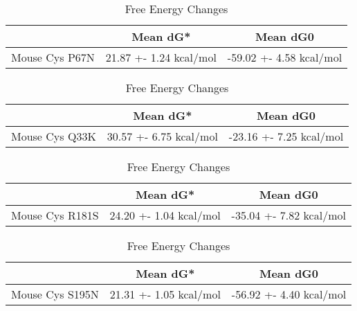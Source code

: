                     \begin{table}[ht]
                      \centering
                      \begin{tabular}{|c|c|c|}
                      \hline
                        & Mean dG* & Mean dG0 \\
                      \hline
               Mouse Cys P67N & 21.87 +- 1.24 kcal/mol & -59.02 +- 4.58 kcal/mol \\
                      \hline
                      \end{tabular}
                      \caption{Free Energy Changes}
                      \end{table}
                      
                    
                      \begin{table}[ht]
                        \centering
                        \begin{tabular}{|c|c|c|}
                        \hline
                          & Mean dG* & Mean dG0 \\
                        \hline
                   Mouse Cys Q33K & 30.57 +- 6.75 kcal/mol & -23.16 +- 7.25 kcal/mol \\
                        \hline
                        \end{tabular}
                        \caption{Free Energy Changes}
                        \end{table}
                        


                        \begin{table}[ht]
                          \centering
                          \begin{tabular}{|c|c|c|}
                          \hline
                            & Mean dG* & Mean dG0 \\
                          \hline
               Mouse Cys R181S & 24.20 +- 1.04 kcal/mol & -35.04 +- 7.82 kcal/mol \\
                          \hline
                          \end{tabular}
                          \caption{Free Energy Changes}
                          \end{table}



                          \begin{table}[ht]
                            \centering
                            \begin{tabular}{|c|c|c|}
                            \hline
                              & Mean dG* & Mean dG0 \\
                            \hline
                Mouse Cys S195N & 21.31 +- 1.05 kcal/mol & -56.92 +- 4.40 kcal/mol \\
                            \hline
                            \end{tabular}
                            \caption{Free Energy Changes}
                            \end{table}
                            



